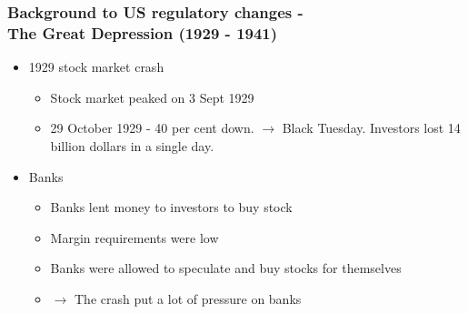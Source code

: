 \documentclass[11pt]{beamer}
\begin{document}
\begin{frame}
\frametitle{Background to US regulatory changes - \\ The Great Depression (1929 - 1941)}
\begin{itemize}
\item 1929 stock market crash
	\begin{itemize}
	\item Stock market peaked on 3 Sept 1929
	\item 29 October 1929 - 40 per cent down. $\rightarrow$ Black Tuesday. Investors lost 14 billion dollars in a single day.
	\end{itemize}
\item Banks
\begin{itemize}
\item Banks lent money to investors to buy stock
\item Margin requirements were low
\item Banks were allowed to speculate and buy stocks for themselves
\item $\rightarrow$ The crash put a lot of pressure on banks
\end{itemize}
\end{itemize}


\end{frame}
\end{document}
